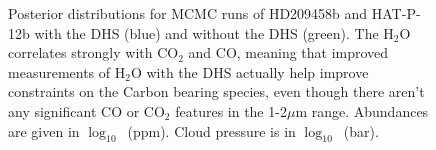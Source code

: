 \documentclass[iop]{emulateapj}
\begin{document}
\begin{figure}[!t]
\centering
{}
	\caption{Posterior distributions for MCMC runs of HD209458b and HAT-P-12b with the DHS (blue) and without the DHS (green). The H$_2$O correlates strongly with CO$_2$ and CO, meaning that improved measurements of H$_2$O with the DHS actually help improve constraints on the Carbon bearing species, even though there aren't any significant CO or CO$_2$ features in the 1-2$\mu$m range. Abundances are given in $\log_{10}$~(ppm). Cloud pressure is in $\log_{10}$~(bar).}
	\label{fig:corner}
\end{figure} 
\end{document}

